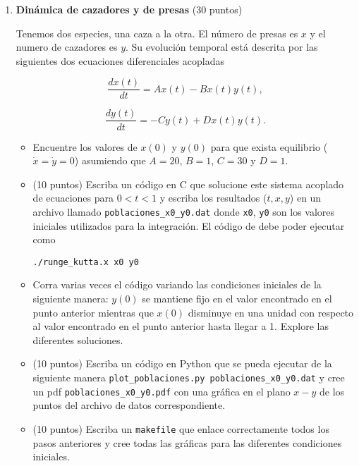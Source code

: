 \documentclass{article}
\begin{document}
\begin{enumerate}


\item {\bf Din\'amica de cazadores y de presas} (30 puntos)


Tenemos dos especies, una caza a la otra. El n\'umero de presas es $x$
y el numero de cazadores es $y$. Su evoluci\'on temporal est\'a
descrita por las siguientes dos ecuaciones diferenciales acopladas

\begin{equation}
\frac{dx (t)}{dt} = Ax(t) - Bx(t)y(t),
\end{equation}

\begin{equation}
\frac{dy (t)}{dt} = -Cy(t) + Dx(t)y(t).
\end{equation}

\begin{itemize}
\item Encuentre los valores de $x(0)$ y $y(0)$ para que exista equilibrio
($\dot{x}=\dot{y}=0$) asumiendo que $A=20$, $B=1$, $C=30$ y $D=1$.

\item (10 puntos) Escriba un c\'odigo en C que solucione este sistema acoplado de
  ecuaciones para $0<t<1$ y escriba los resultados ($t,x,y$) en un
  archivo llamado   \verb"poblaciones_x0_y0.dat" donde \verb"x0",
  \verb"y0" son los   valores iniciales utilizados para la
  integraci\'on. El c\'odigo de   debe poder ejecutar como 
\begin{verbatim}
./runge_kutta.x x0 y0
\end{verbatim}

\item Corra varias veces el c\'odigo variando las
  condiciones iniciales de la siguiente manera: $y(0)$ se mantiene
  fijo en el valor encontrado en el punto anterior mientras que $x(0)$
  disminuye en una unidad con respecto al valor encontrado en el punto
  anterior hasta llegar a 1. Explore las diferentes soluciones.

\item (10 puntos)  Escriba un c\'odigo en Python que se pueda
  ejecutar de la siguiente manera
  \verb"plot_poblaciones.py poblaciones_x0_y0.dat" y cree un pdf
  \verb"poblaciones_x0_y0.pdf" con una gr\'afica en el plano $x-y$ de
  los puntos del archivo de datos 
  correspondiente. 

\item (10 puntos) Escriba un \verb"makefile" que enlace correctamente
  todos los pasos anteriores y cree todas las gr\'aficas para las
  diferentes condiciones iniciales. 
\end{itemize}



\end{enumerate}
\end{document}
